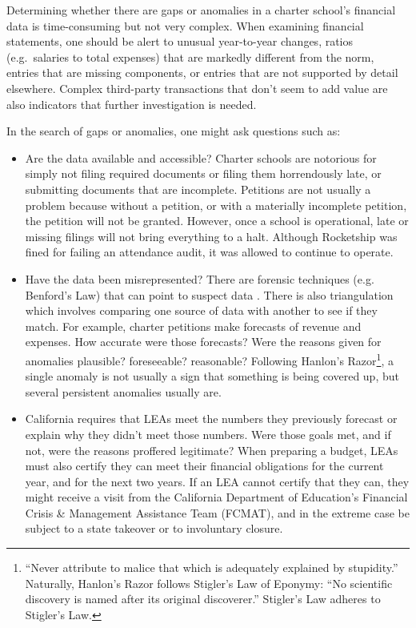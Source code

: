 Determining whether there are gaps or anomalies in a charter school's financial data is time-consuming but not very complex. When examining financial statements, one should be alert to unusual year-to-year changes, ratios (e.g. salaries to total expenses) that are markedly different from the norm, entries that are missing components, or entries that are not supported by detail elsewhere. Complex third-party transactions that don't seem to add value are also indicators that further investigation is needed.

In the search of gaps or anomalies, one might ask questions such as:
\begin{itemize}
\item Are the data available and accessible? Charter schools are notorious for simply not filing required documents or filing them horrendously late, or submitting documents that are incomplete. Petitions are not usually a problem because without a petition, or with a materially incomplete petition, the petition will not be granted. However, once a school is operational, late or missing filings will not bring everything to a halt. Although Rocketship was fined for failing an attendance audit, it was allowed to continue to operate.
  \item Have the data been misrepresented? There are forensic techniques (e.g. Benford's Law) that can point to suspect data \parencite{Zhu.etal2021}. There is also triangulation which involves comparing one source of data with another to see if they match. For example, charter petitions make forecasts of revenue and expenses. How accurate were those forecasts? Were the reasons given for anomalies plausible? foreseeable? reasonable? Following Hanlon's Razor\footnote{``Never attribute to malice that which is adequately explained by stupidity.'' Naturally, Hanlon's Razor follows Stigler's Law of Eponymy: ``No scientific discovery is named after its original discoverer.'' Stigler's Law adheres to Stigler's Law.}, a single anomaly is not usually a sign that something is being covered up, but several persistent anomalies usually are. 
  \item California requires that LEAs meet the numbers they previously forecast or explain why they didn't meet those numbers. Were those goals met, and if not, were the reasons proffered legitimate? When preparing a budget, LEAs must also certify they can meet their financial obligations for the current year, and for the next two years. If an LEA cannot certify that they can, they might receive a visit from the California Department of Education's Financial Crisis \& Management Assistance Team (FCMAT), and in the extreme case be subject to a state takeover or to involuntary closure. 
\end{itemize}%

